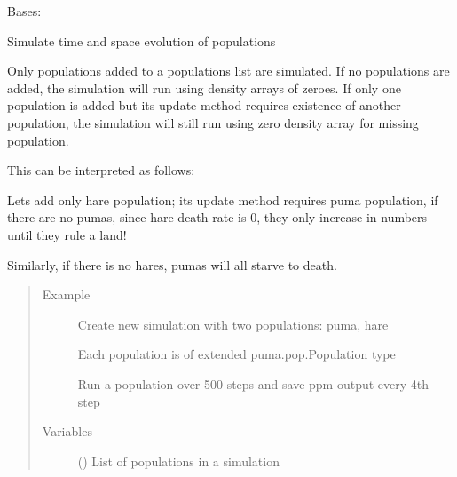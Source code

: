 \documentclass[letterpaper,10pt,english]{sphinxmanual}
\begin{document}
\begin{fulllineitems}
\label{\detokenize{pumha:pumha.sim.Simulation}}
Bases: 

Simulate time and space evolution of populations

Only populations added to a populations list are simulated. If no
populations are added, the simulation will run using density arrays of
zeroes. If only one population is added but its update method requires
existence of another population, the simulation will still run using zero
density array for missing population.

This can be interpreted as follows:

Lets add only hare population; its update method requires puma population,
if there are no pumas, since hare death rate is 0, they only increase in
numbers until they rule a land!

Similarly, if there is no hares, pumas will all starve to death.
\begin{quote}\begin{description}
\item[{Example}] \leavevmode
Create new simulation with two populations: puma, hare

Each population is of extended puma.pop.Population type

Run a population over 500 steps and save ppm output every 4th step

\begin{sphinxVerbatim}[commandchars=\\\{\}]
   
   
 
\end{sphinxVerbatim}

\item[{Variables}] \leavevmode
{} () \textendash{} List of populations in a simulation

\end{description}\end{quote}


\end{fulllineitems}
\end{document}

